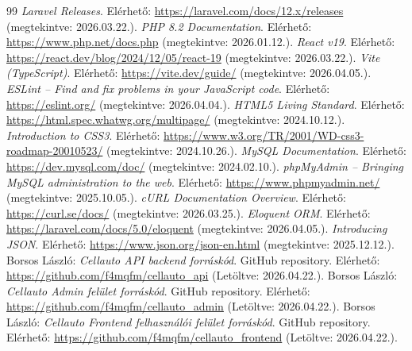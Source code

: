\documentclass{thesis-ekf}
\begin{document}
\begin{thebibliography}{99}
\textit{Laravel Releases}. Elérhető: \url{https://laravel.com/docs/12.x/releases} (megtekintve: 2026.03.22.).
\textit{PHP 8.2 Documentation}. Elérhető: \url{https://www.php.net/docs.php} (megtekintve: 2026.01.12.).
\textit{React v19}. Elérhető: \url{https://react.dev/blog/2024/12/05/react-19} (megtekintve: 2026.03.22.).
\textit{Vite (TypeScript)}. Elérhető: \url{https://vite.dev/guide/} (megtekintve: 2026.04.05.).
\textit{ESLint -- Find and fix problems in your JavaScript code}. Elérhető: \url{https://eslint.org/} (megtekintve: 2026.04.04.).
\textit{HTML5 Living Standard}. Elérhető: \url{https://html.spec.whatwg.org/multipage/} (megtekintve: 2024.10.12.).
\textit{Introduction to CSS3}. Elérhető: \url{https://www.w3.org/TR/2001/WD-css3-roadmap-20010523/} (megtekintve: 2024.10.26.).
\textit{MySQL Documentation}. Elérhető: \url{https://dev.mysql.com/doc/} (megtekintve: 2024.02.10.).
\textit{phpMyAdmin -- Bringing MySQL administration to the web}. Elérhető: \url{https://www.phpmyadmin.net/} (megtekintve: 2025.10.05.).
\textit{cURL Documentation Overview}. Elérhető: \url{https://curl.se/docs/} (megtekintve: 2026.03.25.).
\textit{Eloquent ORM}. Elérhető: \url{https://laravel.com/docs/5.0/eloquent} (megtekintve: 2026.04.05.).
\textit{Introducing JSON}. Elérhető: \url{https://www.json.org/json-en.html} (megtekintve: 2025.12.12.).
Borsos László: \textit{Cellauto API backend forráskód}. GitHub repository. Elérhető: \url{https://github.com/f4mqfm/cellauto_api} (Letöltve: 2026.04.22.).
Borsos László: \textit{Cellauto Admin felület forráskód}. GitHub repository. Elérhető: \url{https://github.com/f4mqfm/cellauto_admin} (Letöltve: 2026.04.22.).
Borsos László: \textit{Cellauto Frontend felhasználói felület forráskód}. GitHub repository. Elérhető: \url{https://github.com/f4mqfm/cellauto_frontend} (Letöltve: 2026.04.22.).
\end{thebibliography}


\end{document}
